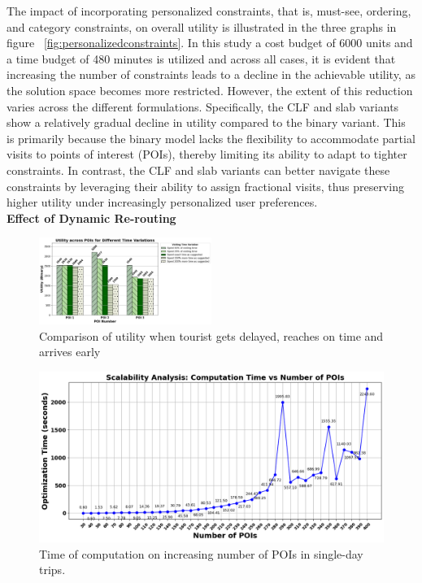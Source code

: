 The impact of incorporating personalized constraints, that is, must-see, ordering, and category constraints, on overall utility is illustrated in the three graphs in figure ~\ref{fig:personalizedconstraints}. In this study a cost budget of 6000 units and a time budget of 480 minutes is utilized and across all cases, it is evident that increasing the number of constraints leads to a decline in the achievable utility, as the solution space becomes more restricted. However, the extent of this reduction varies across the different formulations. Specifically, the CLF and slab variants show a relatively gradual decline in utility compared to the binary variant. This is primarily because the binary model lacks the flexibility to accommodate partial visits to points of interest (POIs), thereby limiting its ability to adapt to tighter constraints. In contrast, the CLF and slab variants can better navigate these constraints by leveraging their ability to assign fractional visits, thus preserving higher utility under increasingly personalized user preferences.\\

\noindent\textbf{Effect of Dynamic Re-routing}
\begin{figure}[th]
    \centering
    \includegraphics[width=0.50\textwidth]{plots/dynamic_pkj.png}
    \caption{Comparison of utility when tourist gets delayed, reaches on time and arrives early}
    \label{fig:dynamic}
\end{figure}

\begin{figure}[htbp]
    \centering
    \includegraphics[width=\textwidth]{plots/scalability_pkj.png}
    \caption{Time of computation on increasing number of POIs in single-day trips.}
    \label{fig:scalability1}
\end{figure}

